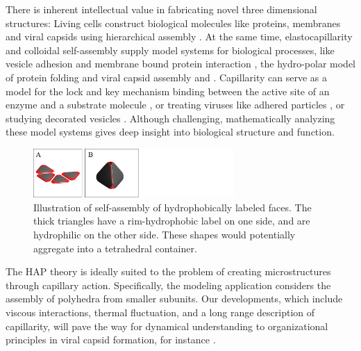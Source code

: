 There is inherent intellectual value in fabricating novel three dimensional structures: Living cells construct biological molecules like proteins, membranes and viral capsids using hierarchical assembly \cite{Whitesides2002}. At the same time, elastocapillarity and colloidal self-assembly supply model systems for biological processes, like vesicle adhesion and membrane bound protein interaction \cite{Dasgupta2017}, the hydro-polar model of protein folding \cite{Lau1989,Pandey2011} and viral capsid assembly and \cite{CASPAR1962}. Capillarity can serve as a model for the lock and key mechanism binding between the active site of an enzyme and a substrate molecule \cite{Araujo2018}, or treating viruses like adhered particles 
\cite{Agudo-Canalejo2017,Agudo-Canalejo2015,Deserno2004}, or studying decorated vesicles 
\cite{Auth2009,Weikl2002,Atilgan2007}. Although challenging, mathematically analyzing these model systems gives deep insight into biological structure and function.


\begin{figure}
\vspace*{+15pt}
\centerline{\includegraphics[width=3.0in]{figures/SA3_fig2.pdf}}
\vspace*{5pt}
\caption{{\footnotesize Illustration of self-assembly of hydrophobically labeled faces.
The thick triangles have a rim-hydrophobic label on one side, and are hydrophilic on the other side.
These shapes would potentially aggregate into a tetrahedral container. }}
\label{fig:illustration}
\end{figure}
The HAP theory is ideally suited to the problem of creating microstructures through capillary action. Specifically, the modeling application considers the assembly of polyhedra from smaller subunits. Our developments, which include viscous interactions, thermal fluctuation, and a long range description of capillarity, will pave the way for dynamical understanding to organizational principles in viral capsid formation, for instance \cite{CASPAR1962,Prasad2012}. 

